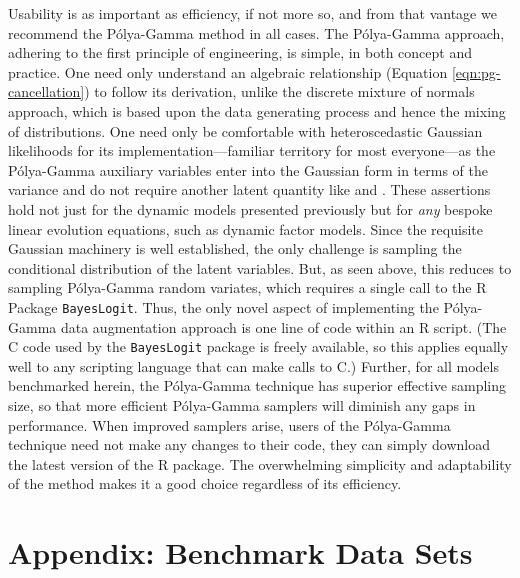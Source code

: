 \documentclass[12pt]{article}
\newcommand{\Polya}{P\'{o}lya}
\begin{document}
Usability is as important as efficiency, if not more so, and from that vantage
we recommend the \Polya-Gamma method in all cases.  The \Polya-Gamma approach,
adhering to the first principle of engineering, is simple, in both concept and
practice.  One need only understand an algebraic relationship (Equation
\ref{eqn:pg-cancellation}) to follow its derivation, unlike the discrete mixture
of normals approach, which is based upon the data generating process and hence
the mixing of distributions.  One need only be comfortable with heteroscedastic
Gaussian likelihoods for its implementation---familiar territory for most
everyone---as the \Polya-Gamma auxiliary variables enter into the Gaussian form
in terms of the variance and do not require another latent quantity like
\cite{fruhwirth-schnatter-etal-2009} and \cite{fussl-etal-2013}.  These
assertions hold not just for the dynamic models presented previously but for
\emph{any} bespoke linear evolution equations, such as dynamic factor models.
Since the requisite Gaussian machinery is well established, the only challenge
is sampling the conditional distribution of the latent variables.  But, as seen
above, this reduces to sampling \Polya-Gamma random variates, which requires a
single call to the R Package \texttt{BayesLogit}.  Thus, the only novel aspect
of implementing the \Polya-Gamma data augmentation approach is one line of code
within an R script.  (The C code used by the \texttt{BayesLogit} package is
freely available, so this applies equally well to any scripting language that
can make calls to C.)  Further, for all models benchmarked herein, the
\Polya-Gamma technique has superior effective sampling size, so that more
efficient \Polya-Gamma samplers will diminish any gaps in performance.  When
improved samplers arise, users of the \Polya-Gamma technique need not make any
changes to their code, they can simply download the latest version of the R
package.  The overwhelming simplicity and adaptability of the method makes it a
good choice regardless of its efficiency.

\section*{Appendix: Benchmark Data Sets}
\label{sec:benchmark-details}

\end{document}

